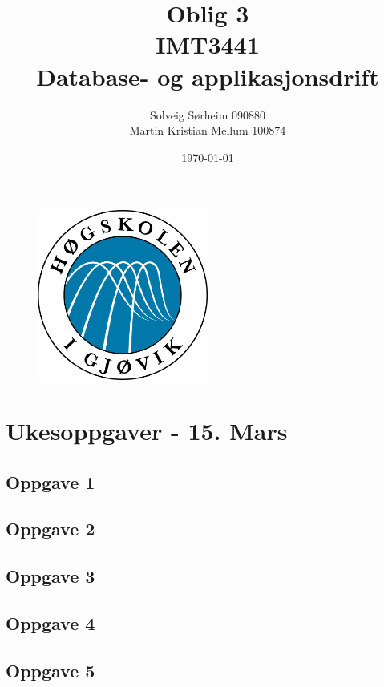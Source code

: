\documentclass[a4paper, norsk, 12pt]{article}
\title{Oblig 3 \\ IMT3441 \\ Database- og applikasjonsdrift}
\author{Solveig Sørheim 090880 \\ Martin Kristian Mellum 100874}
\date{\today}
\begin{document}
\begin{figure}[h!]
 \centering
  \includegraphics[width=0.5\textwidth]{Images/hig_logo.png}
 \maketitle       %
\end{figure}
\pagebreak
\tableofcontents %
\pagebreak	%


\section{Ukesoppgaver - 15. Mars}
\subsection{Oppgave 1}
\subsection{Oppgave 2}
\subsection{Oppgave 3}
\subsection{Oppgave 4}
\subsection{Oppgave 5}
\end{document}
